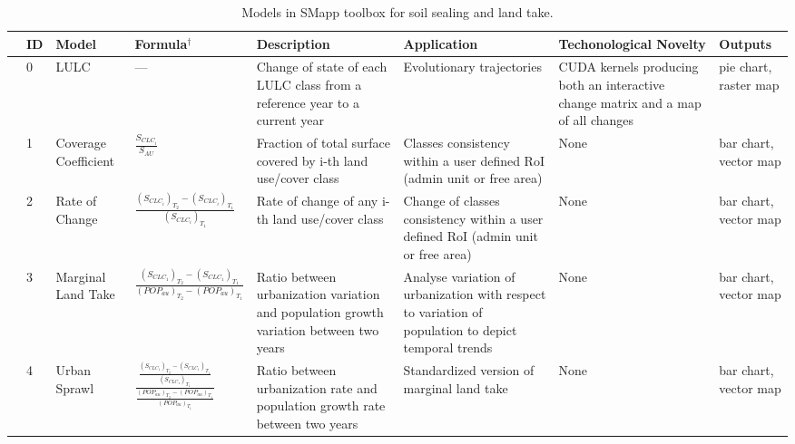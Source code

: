 \documentclass[APA,LATO1COL,doublespace]{WileyNJD-v2}
\begin{document}
\begin{table}[b]
    \caption{ Models in SMapp toolbox for soil sealing and land take. }
    \label{tab:SMappToolbox}
    \small
    \centering
    \begin{tabular}{m{0.3cm} p{0.1cm} p{1.2cm} p{3.5cm} *{3}{p{2.7cm}} p{1.0cm} }
    
    \toprule
        & \textbf{ID} & \textbf{Model} & \textbf{Formula$^\dagger$} & \textbf{Description} & \textbf{Application} & \textbf{Techonological Novelty} & \textbf{Outputs}\\
    \midrule\midrule
    
    & 0 & LULC & --- & Change of state of each LULC class from a reference year to a current year & Evolutionary trajectories & CUDA kernels producing both an interactive change matrix and a map of all changes & pie chart, raster map  \\
    
    & 1	& Coverage Coefficient & $\frac{S_{CLC_i}}{S_{AU}}$ & Fraction of total surface covered by i-th land use/cover class & Classes consistency within a user defined RoI (admin unit or free area) & None & bar chart, vector map \\
        
    & 2 & Rate of Change & 
    $\frac{ \left(S_{CLC_i}\right)_{T_2} - \left(S_{CLC_i}\right)_{T_1} }{ \left(S_{CLC_i}\right)_{T_1} }$ 
    & Rate of change of any i-th land use/cover class & Change of classes consistency within a user defined RoI (admin unit or free area) & None & bar chart, vector map \\
    
    & 3 & Marginal Land Take & 
    $\frac{ \left(S_{CLC_1}\right)_{T_2} - \left(S_{CLC_1}\right)_{T_1} }{ \left(POP_{au}\right)_{T_2} - \left(POP_{au}\right)_{T_1} }$
    & Ratio between urbanization variation and population growth variation between two years & Analyse variation of urbanization with respect to variation of population to depict temporal trends & None & bar chart, vector map \\
    
    & 4	& Urban Sprawl & 
    $\frac{ \frac{ \left(S_{CLC_1}\right)_{T_2} - \left(S_{CLC_1}\right)_{T_1} }{ \left(S_{CLC_1}\right)_{T_1} }  }     { \frac{ \left(POP_{au}\right)_{T_2} - \left(POP_{au}\right)_{T_1} }{ \left(POP_{au}\right)_{T_1} } }$
    & Ratio between urbanization rate and population growth rate between two years & Standardized version of marginal land take & None & bar chart, vector map \\
    

\end{tabular}
\end{table}
\end{document}
